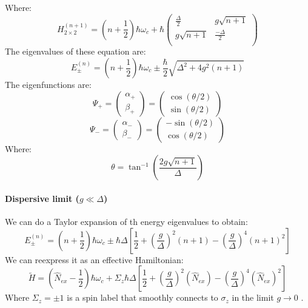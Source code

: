 \documentclass[12pt]{article}
\numberwithin{equation}{subsection}
\newcommand\page[1]{
{
}
}
\begin{document}
\page{79/86}

Where:
\begin{equation}
     H^{(n+1)}_{2\times 2}
     =\left(n+\frac{1}{2}\right) \hbar \omega_c + 
     \hbar\begin{pmatrix}
    \frac{\Delta}{2} & g\sqrt{n+1}\\
     g\sqrt{n+1}&\frac{-\Delta}{2} \\
    \end{pmatrix}
\end{equation}
The eigenvalues of these equation are:
\begin{equation}
    E^{(n)}_\pm =\left(n+\frac{1}{2}\right) \hbar \omega_c \pm \frac{\hbar}{2} \sqrt{\Delta ^2 + 4g^2 (n+1)}
\end{equation}
The eigenfunctions are:
\begin{equation}
    \Psi_+ = 
    \begin{pmatrix}
    \alpha_+ \\
    \beta_+
    \end{pmatrix}
    =\begin{pmatrix}
   \cos(\theta/2)\\
   \sin(\theta/2) 
    \end{pmatrix}
    
\end{equation}
\begin{equation}
    \Psi_- = 
    \begin{pmatrix}
    \alpha_- \\
    \beta_-
    \end{pmatrix}
    =\begin{pmatrix}
   -\sin(\theta/2)\\ 
   \cos(\theta/2)
    \end{pmatrix}
    
\end{equation}
Where:
\begin{equation}
    \theta = \tan^{-1} \left (   \frac{2g\sqrt{n+1}}{\Delta}  \right )
    \label{eq:theta-cav-atom}
\end{equation}
\paragraph{Dispersive limit ($g\ll \Delta$)} We can do a Taylor expansion of th energy eigenvalues to obtain:
\begin{equation}
    E^{(n)}_\pm =\left(n+\frac{1}{2}\right) \hbar \omega_c \pm \hbar \Delta \left [ \frac{1}{2} + \left(\frac{g}{\Delta}\right)^2 (n+1) - \left(\frac{g}{\Delta}\right)^4 (n+1)^2\right]
\end{equation}
We can reexpress it as an effective Hamiltonian:
\begin{equation}
    \tilde H =\left(\hat N_{ex}-\frac{1}{2}\right) \hbar \omega_c + \Sigma_z \hbar \Delta \left [ \frac{1}{2} + \left(\frac{g}{\Delta}\right)^2 (\hat N_{ex}) - \left(\frac{g}{\Delta}\right)^4 (\hat N_{ex})^2\right]
\end{equation}
Where $\Sigma_z = \pm 1$ is a spin label that smoothly connects to $\sigma_z$ in the limit $g\rightarrow 0 $ .
\end{document}

